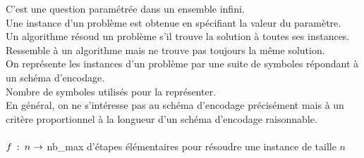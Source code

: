  C'est une question paramétrée dans un ensemble infini. \\

 Une instance d'un problème est obtenue en spécifiant la valeur du paramètre.\\

 Un algorithme résoud un problème s'il trouve la solution à toutes ses instances.\\ 

 Ressemble à un algorithme mais ne trouve pas toujours la même solution. \\

 On représente les instances d'un problème par une suite de symboles répondant à un schéma d'encodage.\\

 Nombre de symboles utilisés pour la représenter.\\

 En général, on ne s'intéresse pas au schéma d'encodage précisément mais à un critère proportionnel à la longueur d'un schéma d'encodage raisonnable.\\

 \\$f\: : \: n \rightarrow$ nb\_max d'étapes élémentaires pour résoudre une instance de taille $n$
